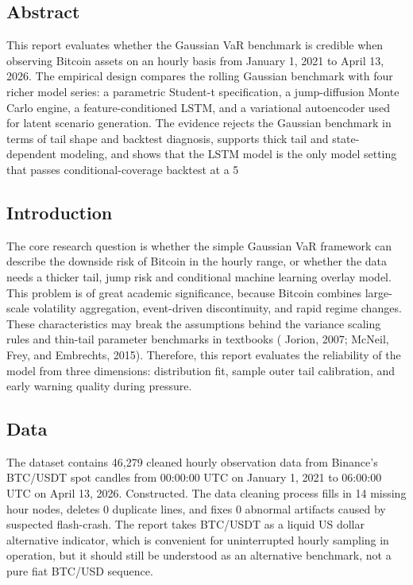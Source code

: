 \setlength{\LTleft}{\fill}
\setlength{\LTright}{\fill}
\renewcommand{\arraystretch}{1.05}

\subsection{Abstract}

This report evaluates whether the Gaussian VaR benchmark is credible when observing Bitcoin assets on an hourly basis from January 1, 2021 to April 13, 2026. The empirical design compares the rolling Gaussian benchmark with four richer model series: a parametric Student-t specification, a jump-diffusion Monte Carlo engine, a feature-conditioned LSTM, and a variational autoencoder used for latent scenario generation.  The evidence rejects the Gaussian benchmark in terms of tail shape and backtest diagnosis, supports thick tail and state-dependent modeling, and shows that the LSTM model is the only model setting that passes conditional-coverage backtest at a 5%

\subsection{Introduction}

The core research question is whether the simple Gaussian VaR framework can describe the downside risk of Bitcoin in the hourly range, or whether the data needs a thicker tail, jump risk and conditional machine learning overlay model. This problem is of great academic significance, because Bitcoin combines large-scale volatility aggregation, event-driven discontinuity, and rapid regime changes. These characteristics may break the assumptions behind the variance scaling rules and thin-tail parameter benchmarks in textbooks ( Jorion, 2007; McNeil, Frey, and Embrechts, 2015). Therefore, this report evaluates the reliability of the model from three dimensions: distribution fit, sample outer tail calibration, and early warning quality during pressure.

\subsection{Data}

The dataset contains 46,279 cleaned hourly observation data from Binance's BTC/USDT spot candles from 00:00:00 UTC on January 1, 2021 to 06:00:00 UTC on April 13, 2026. Constructed. The data cleaning process fills in 14 missing hour nodes, deletes 0 duplicate lines, and fixes 0 abnormal artifacts caused by suspected flash-crash. The report takes BTC/USDT as a liquid US dollar alternative indicator, which is convenient for uninterrupted hourly sampling in operation, but it should still be understood as an alternative benchmark, not a pure fiat BTC/USD sequence.

